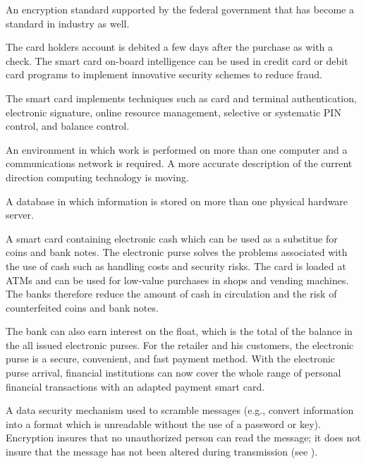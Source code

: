 \begin{htmllist}
\item[Data Encryption Standard (DES)]

An encryption standard supported by the federal government that has
become a standard in industry as well.


\item[Debit Card]

The card holders account is debited a few days after the purchase as
with a check. The smart card on-board intelligence can be used in
credit card or debit card programs to implement innovative security
schemes to reduce fraud.


The smart card implements techniques such as card and terminal
authentication, electronic signature, online resource management,
selective or systematic PIN control, and balance control.


\item[Distributed Computing]

An environment in which work is performed on more than one computer and
a communications network is required. A more accurate description of
the current direction computing technology is moving.


\item[Distributed Database]

A database in which information is stored on more than one physical
hardware server.


\item[Electronic Purse]

A smart card containing electronic cash which can be used as a
substitue for coins and bank notes. The electronic purse solves the
problems associated with the use of cash such as handling costs and
security risks. The card is loaded at ATMs and can be used for
low-value purchases in shops and vending machines. The banks therefore
reduce the amount of cash in circulation and the risk of counterfeited
coins and bank notes.


The bank can also earn interest on the float, which is the total of the
balance in the all issued electronic purses. For the retailer and his
customers, the electronic purse is a secure, convenient, and fast
payment method. With the electronic purse arrival, financial
institutions can now cover the whole range of personal financial
transactions with an adapted payment smart card.


\item[Encryption]
\label{encrypt}

A data security mechanism used to scramble messages (e.g., convert
information into a format which is unreadable without the use of a
password or key). Encryption insures that no unauthorized person can
read the message; it does not insure that the message has not been
altered during transmission (see ).



\end{htmllist}

